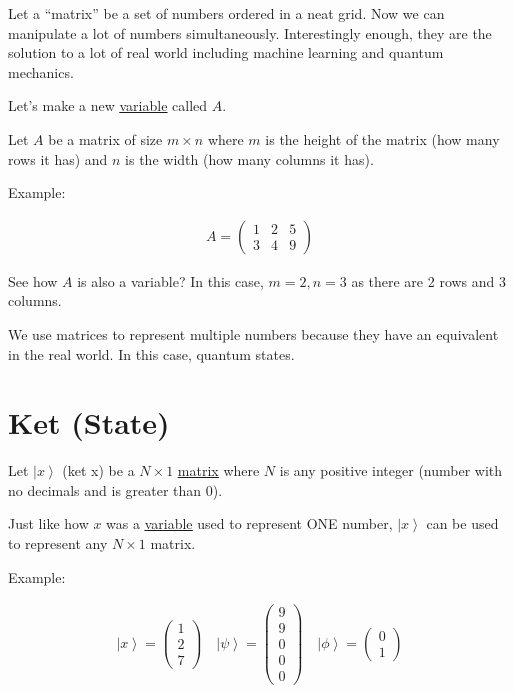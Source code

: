 \documentclass[
]{article}
\let\oldhyperref\hyperref
\renewcommand{\hyperref}[2][]{\oldhyperref[#1]{\underline{#2}}}
\providecommand{\ket}[1]{\left\lvert #1 \right\rangle}
\begin{document}
Let a ``matrix'' be a set of numbers ordered in a neat grid. Now we
can manipulate a lot of numbers simultaneously. Interestingly enough,
they are the solution to a lot of real world including machine learning
and quantum mechanics.

Let's make a new
\hyperref[variables-addition]{variable}
called \(A\).

Let \(A\) be a matrix of size \(m\times n\) where \(m\) is the height of
the matrix (how many rows it has) and \(n\) is the width (how many
columns it has).

Example:

\begin{gather*}
	A=\begin{pmatrix}
		1 & 2 & 5 \\
		3 & 4 & 9
	\end{pmatrix}
\end{gather*}



See how \(A\) is also a variable? In this case, \(m=2, n=3\) as there
are 2 rows and 3 columns.

We use matrices to represent multiple numbers because they have an
equivalent in the real world. In this case, quantum states.

\section{Ket (State)}\label{ket-states}

Let \(\ket{x}\) (ket x) be a \(N \times 1\) \hyperref[matrices]{matrix} where \(N\) is any
positive integer (number with no decimals and is greater than 0).

Just like how \(x\) was a \hyperref[variable]{variable} used to represent ONE number,
\(\ket{x}\) can be used to represent any \(N\times 1\) matrix.

Example:

\begin{gather*}
	\ket{x}=\begin{pmatrix}
		1 \\
		2 \\
		7
	\end{pmatrix}\quad \ket{\psi}=\begin{pmatrix}
		9 \\
		9 \\
		0 \\
		0 \\
		0
	\end{pmatrix}\quad\ket{\phi}=\begin{pmatrix}
		0 \\
		1
	\end{pmatrix}
\end{gather*}
\end{document}
